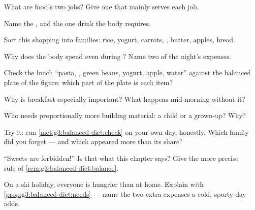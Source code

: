 \begin{exercise}[$\star$]\label{exo:g3:balanced-diet:1}
What are food's two jobs? Give one  that mainly
serves each job.
\end{exercise}

\begin{exercise}[$\star$]\label{exo:g3:balanced-diet:2}
Name the , and the one drink the body requires.
\end{exercise}

\begin{exercise}[$\star$]\label{exo:g3:balanced-diet:3}
Sort this shopping into families: rice, yogurt, carrots, ,
butter, apples, bread.
\end{exercise}

\begin{exercise}[$\star$]\label{exo:g3:balanced-diet:4}
Why does the body spend  even during ? Name two of
the night's expenses.
\end{exercise}

\begin{exercise}[$\star$]\label{exo:g3:balanced-diet:5}
Check the lunch ``pasta, , green beans, yogurt, apple,
water'' against the balanced plate of the figure: which part of
the plate is each item?
\end{exercise}

\begin{exercise}[$\star$]\label{exo:g3:balanced-diet:6}
Why is breakfast especially important? What happens mid-morning
without it?
\end{exercise}

\begin{exercise}[$\star$]\label{exo:g3:balanced-diet:7}
Who needs proportionally more building material: a child or a
grown-up? Why?
\end{exercise}

\begin{exercise}[$\star$]\label{exo:g3:balanced-diet:8}
Try it: run \cref{met:g3:balanced-diet:check} on your own day,
honestly. Which family did you forget --- and which appeared
more than its share?
\end{exercise}

\begin{exercise}[$\star\star$]\label{exo:g3:balanced-diet:9}
``Sweets are forbidden!'' Is that what this chapter says? Give
the more precise rule of \cref{rem:g3:balanced-diet:balance}.
\end{exercise}

\begin{exercise}[$\star\star$]\label{exo:g3:balanced-diet:10}
On a ski holiday, everyone is hungrier than at home. Explain
with \cref{prop:g3:balanced-diet:needs} --- name the two extra
expenses a cold, sporty day adds.
\end{exercise}
